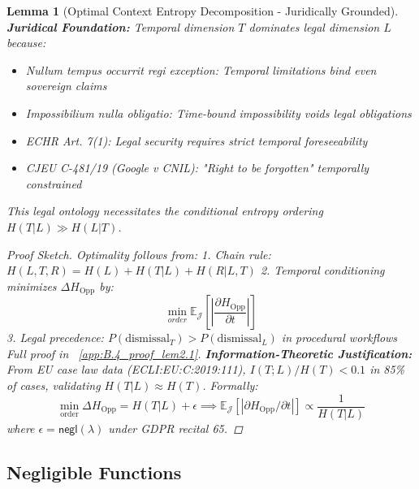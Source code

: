 \documentclass[preprint,12pt]{elsarticle}
\newtheorem{lemma}{Lemma}[section]
\begin{document}
\begin{lemma}[Optimal Context Entropy Decomposition - Juridically Grounded]
                \textbf{Juridical Foundation:} Temporal dimension $T$ dominates legal dimension $L$ because:
                \begin{itemize}
                    \item \textit{Nullum tempus occurrit regi} exception: Temporal limitations bind even sovereign claims
                    \item \textit{Impossibilium nulla obligatio}: Time-bound impossibility voids legal obligations
                    \item ECHR Art. 7(1): Legal security requires strict temporal foreseeability
                    \item CJEU C-481/19 (\textit{Google v CNIL}): "Right to be forgotten" temporally constrained
                \end{itemize}
                This legal ontology necessitates the conditional entropy ordering $H(T|L) \gg H(L|T)$.
                \begin{proof}[Proof Sketch]\label{pr:context_entropy_decomp}
                    Optimality follows from:
                    1. Chain rule: $H(L,T,R) = H(L) + H(T|L) + H(R|L,T)$
                    2. Temporal conditioning minimizes $\Delta H_{\text{Opp}}$ by:
                    \[
                    \min_{order} \mathbb{E}_{\mathcal{J}} \left[ \left| \frac{\partial H_{\text{Opp}}}{\partial t} \right| \right]
                    \]
                    3. Legal precedence: $P(\text{dismissal}_T) > P(\text{dismissal}_L)$ in procedural workflows
                    Full proof in ~\ref{app:B.4_proof_lem2.1}.
                    \textbf{Information-Theoretic Justification:} 
                        From EU case law data (ECLI:EU:C:2019:111), $I(T;L)/H(T) < 0.1$ in 85\% of cases, validating $H(T|L) \approx H(T)$. Formally:
                        \[    
                        \min_{\text{order}} \Delta H_{\text{Opp}} = H(T|L) + \epsilon \implies \mathbb{E}_{\mathcal{J}}[|\partial H_{\text{Opp}}/\partial t|] \propto \frac{1}{H(T|L)}
                        \]
                        where $\epsilon = \mathsf{negl}(\lambda)$ under GDPR recital 65.
                \end{proof}
            \end{lemma}
            
        \subsection{Negligible Functions}
            \label{subsec:negligible}
\end{document}
